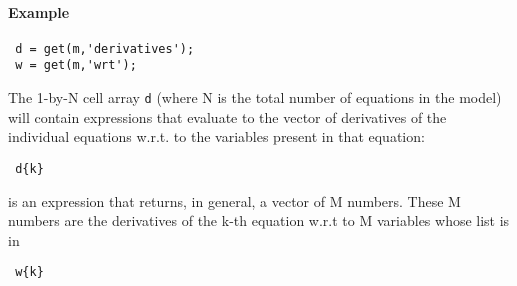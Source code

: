  \paragraph{Example}
 
 \begin{verbatim}
 d = get(m,'derivatives');
 w = get(m,'wrt');
 \end{verbatim}
 
 The 1-by-N cell array \texttt{d} (where N is the total number of
 equations in the model) will contain expressions that evaluate to the
 vector of derivatives of the individual equations w.r.t. to the
 variables present in that equation:
 
 \begin{verbatim}
 d{k}
 \end{verbatim}
 
 is an expression that returns, in general, a vector of M numbers. These
 M numbers are the derivatives of the k-th equation w.r.t to M variables
 whose list is in
 
 \begin{verbatim}
 w{k}
 \end{verbatim}


